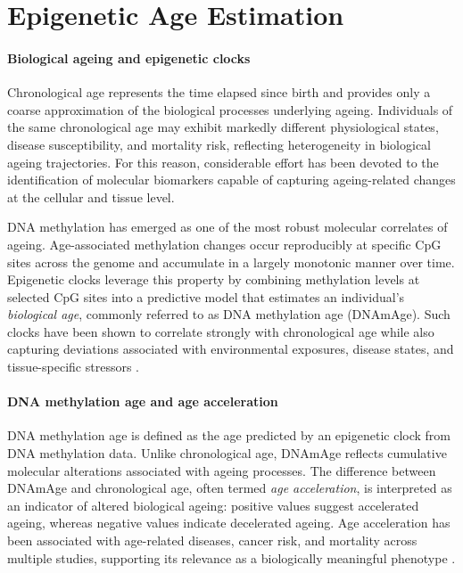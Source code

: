\documentclass[10pt]{extarticle}
\begin{document}

\section{Epigenetic Age Estimation}

\paragraph{Biological ageing and epigenetic clocks}
Chronological age represents the time elapsed since birth and provides only a coarse approximation of the biological processes underlying ageing. Individuals of the same chronological age may exhibit markedly different physiological states, disease susceptibility, and mortality risk, reflecting heterogeneity in biological ageing trajectories. For this reason, considerable effort has been devoted to the identification of molecular biomarkers capable of capturing ageing-related changes at the cellular and tissue level.

DNA methylation has emerged as one of the most robust molecular correlates of ageing. Age-associated methylation changes occur reproducibly at specific CpG sites across the genome and accumulate in a largely monotonic manner over time. Epigenetic clocks leverage this property by combining methylation levels at selected CpG sites into a predictive model that estimates an individual's \emph{biological age}, commonly referred to as DNA methylation age (DNAmAge). Such clocks have been shown to correlate strongly with chronological age while also capturing deviations associated with environmental exposures, disease states, and tissue-specific stressors \cite{Horvath2013,Zhang2019}.

\paragraph{DNA methylation age and age acceleration}
DNA methylation age is defined as the age predicted by an epigenetic clock from DNA methylation data. Unlike chronological age, DNAmAge reflects cumulative molecular alterations associated with ageing processes. The difference between DNAmAge and chronological age, often termed \emph{age acceleration}, is interpreted as an indicator of altered biological ageing: positive values suggest accelerated ageing, whereas negative values indicate decelerated ageing. Age acceleration has been associated with age-related diseases, cancer risk, and mortality across multiple studies, supporting its relevance as a biologically meaningful phenotype \cite{Horvath2013,Zhang2019}.
\end{document}
